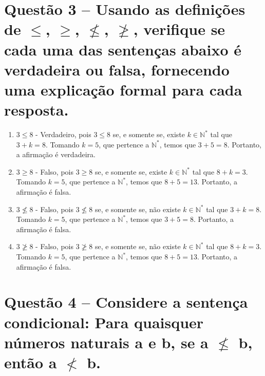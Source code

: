 \documentclass[12pt,a4paper]{article}
\begin{document}
\section*{Questão 3 -- Usando as definições de $\leq$, $\geq$, $\nleq$, $\ngeq$, verifique se cada uma das sentenças abaixo é verdadeira ou falsa, fornecendo uma explicação formal para cada resposta.}
    
    \begin{enumerate}[label= (\alph*)]
        \item $3 \leq 8$ - Verdadeiro, pois $3 \leq 8$ se, e somente se, existe $k \in \mathbb{N}^*$ tal que $3 + k = 8$. 
        Tomando $k = 5$, que pertence a $\mathbb{N}^*$, temos que $3 + 5 = 8$. 
        Portanto, a afirmação é verdadeira.
        
        \item $3 \geq 8$ - Falso, pois $3 \geq 8$ se, e somente se, existe $k \in \mathbb{N}^*$ tal que $8 + k = 3$. 
        Tomando $k = 5$, que pertence a $\mathbb{N}^*$, temos que $8 + 5 = 13$. 
        Portanto, a afirmação é falsa.
        
        \item $3 \nleq 8$ - Falso, pois $3 \nleq 8$ se, e somente se, não existe $k \in \mathbb{N}^*$ tal que $3 + k = 8$. 
        Tomando $k = 5$, que pertence a $\mathbb{N}^*$, temos que $3 + 5 = 8$. 
        Portanto, a afirmação é falsa.
        
        \item $3 \ngeq 8$ - Falso, pois $3 \ngeq 8$ se, e somente se, não existe $k \in \mathbb{N}^*$ tal que $8 + k = 3$. 
        Tomando $k = 5$, que pertence a $\mathbb{N}^*$, temos que $8 + 5 = 13$. 
        Portanto, a afirmação é falsa.
    \end{enumerate}

\section*{Questão 4 -- Considere a sentença condicional: Para quaisquer números naturais a e b, se a $\nleq$ b, então a $\nless$ b.}
\end{document}

